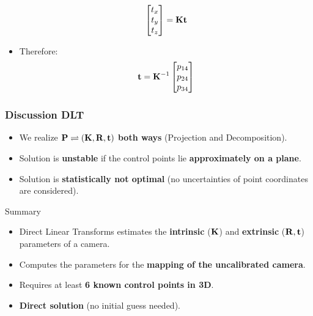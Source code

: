 \begin{frame}
\begin{itemize}
\begin{equation*}
\begin{bmatrix}
          t_x \\
          t_y \\
          t_z
      \end{bmatrix} = \boldsymbol{\mathbf{K}} \boldsymbol{\mathbf{t}}
    \end{equation*}
    \item Therefore:
    \begin{equation*}
      \boldsymbol{\mathbf{t}} = \boldsymbol{\mathbf{K}}^{-1}
      \begin{bmatrix}
          p_{14} \\
          p_{24} \\
          p_{34}
      \end{bmatrix}
    \end{equation*}
  \end{itemize}
\end{frame}

\begin{frame}
  \frametitle{Discussion DLT}
    \begin{itemize}
        \item We realize $\boldsymbol{\mathbf{P}} \rightleftharpoons (\boldsymbol{\mathbf{K}}, \boldsymbol{\mathbf{R}}, \boldsymbol{\mathbf{t}})$ \textbf{both ways} (Projection and Decomposition).
        \item Solution is \textbf{unstable} if the control points lie \textbf{approximately on a plane}.
        \item Solution is \textbf{statistically not optimal} (no uncertainties of point coordinates are considered).
    \end{itemize}
\end{frame}

\begin{frame}{Summary}
    \begin{itemize}
        \item Direct Linear Transforms estimates the \textbf{intrinsic} ($\boldsymbol{\mathbf{K}}$) and \textbf{extrinsic} ($\boldsymbol{\mathbf{R}}, \boldsymbol{\mathbf{t}}$) parameters of a camera.
        \item Computes the parameters for the \textbf{mapping of the uncalibrated camera}.
        \item Requires at least \textbf{6 known control points in 3D}.
        \item \textbf{Direct solution} (no initial guess needed).
    \end{itemize}
\end{frame}

